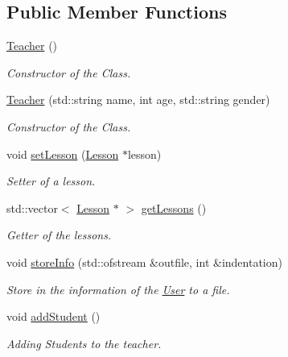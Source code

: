 \subsection*{Public Member Functions}
\begin{DoxyCompactItemize}
\item 
\mbox{\label{class_teacher_a0d09b151c46e2abb647a2ae40cc5510c}} 
\mbox{\hyperlink{class_teacher_a0d09b151c46e2abb647a2ae40cc5510c}{Teacher}} ()
\begin{DoxyCompactList}\small\item\em Constructor of the Class. \end{DoxyCompactList}\item 
\mbox{\hyperlink{class_teacher_adb308468e6ed8bbbffaba9cbf1ae646e}{Teacher}} (std\+::string name, int age, std\+::string gender)
\begin{DoxyCompactList}\small\item\em Constructor of the Class. \end{DoxyCompactList}\item 
void \mbox{\hyperlink{class_teacher_aec95be6f77dc2b692627a6f4a5385971}{set\+Lesson}} (\mbox{\hyperlink{class_lesson}{Lesson}} $\ast$lesson)
\begin{DoxyCompactList}\small\item\em Setter of a lesson. \end{DoxyCompactList}\item 
std\+::vector$<$ \mbox{\hyperlink{class_lesson}{Lesson}} $\ast$ $>$ \mbox{\hyperlink{class_teacher_a7782ce22f7e2313d89bceaeacec18dfb}{get\+Lessons}} ()
\begin{DoxyCompactList}\small\item\em Getter of the lessons. \end{DoxyCompactList}\item 
void \mbox{\hyperlink{class_teacher_a2ece0d60fa7ec4aaf93333aa0be0d25f}{store\+Info}} (std\+::ofstream \&outfile, int \&indentation)
\begin{DoxyCompactList}\small\item\em Store in the information of the \mbox{\hyperlink{class_user}{User}} to a file. \end{DoxyCompactList}\item 
\mbox{\label{class_teacher_afd85dc703e8ddad28e298c1dcc697ee4}} 
void \mbox{\hyperlink{class_teacher_afd85dc703e8ddad28e298c1dcc697ee4}{add\+Student}} ()
\begin{DoxyCompactList}\small\item\em Adding Students to the teacher. \end{DoxyCompactList}\item 

\end{DoxyCompactItemize}
